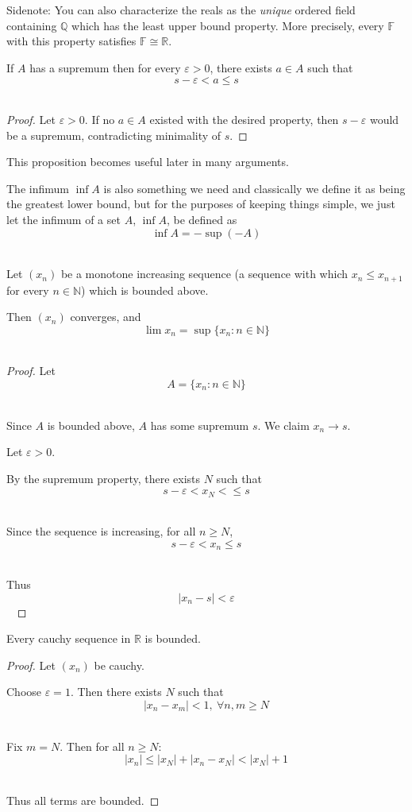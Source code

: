Sidenote: You can also characterize the reals 
as the \emph{unique} ordered field containing $\mathbb Q$ which 
has the least upper bound property. More precisely, every 
$\mathbb F$ with this property satisfies $\mathbb F \cong \mathbb R$.

\begin{prop}
    If $A$ has a supremum then for every $\varepsilon > 0$, 
    there exists $a \in A$ such that 
    $$ 
        s - \varepsilon < a \leq s
    $$ 
\end{prop}
\begin{proof}
    Let $\varepsilon > 0$. If no $a \in A$ existed with the 
    desired property, then $s - \varepsilon$ would be a supremum, 
    contradicting minimality of $s$.
\end{proof}
This proposition becomes useful later in many arguments. 

The infimum $\inf A$ is also something we need and classically we 
define it as being the greatest lower bound, but for 
the purposes of keeping things simple, we 
just let the infimum of a set $A$, $\inf A$, be defined as 
$$ 
    \inf A = -\sup(-A)
$$ 

\newpage 
\begin{thm}
    Let $(x_n)$ be a monotone increasing sequence 
    (a sequence with which $x_n \leq x_{n+1}$ for every 
    $n \in \mathbb N$) which is bounded above. 

    Then $(x_n)$ converges, and 
    $$ 
        \lim x_n = \sup\{x_n : n \in \mathbb N\}
    $$ 
\end{thm}
\begin{proof}
    Let 
    $$ 
        A = \{x_n : n \in \mathbb N\}
    $$ 
    
    Since $A$ is bounded above, $A$ has some supremum $s$. 
    We claim $x_n \to s$. 

    Let $\varepsilon > 0$. 

    By the supremum property, there exists $N$ such that 
    $$ 
        s - \varepsilon < x_N < \leq s
    $$ 
    
    Since the sequence is increasing, for all $n \geq N$, 
    $$ 
        s - \varepsilon < x_n \leq s
    $$ 

    Thus 
    $$ 
        |x_n - s| < \varepsilon
    $$ 
\end{proof}

\begin{lem}
    Every cauchy sequence in $\mathbb R$ is bounded. 
\end{lem}
\begin{proof}
    Let $(x_n)$ be cauchy. 

    Choose $\varepsilon = 1$. Then there exists $N$ such 
    that 
    $$ 
        |x_n - x_m| < 1, \: \forall n,m \geq N
    $$ 

    Fix $m = N$. Then for all $n \geq N$: 
    $$ 
        |x_n| \leq |x_N| + |x_n - x_N| < |x_N| + 1
    $$ 
    
    Thus all terms are bounded. 
\end{proof}

